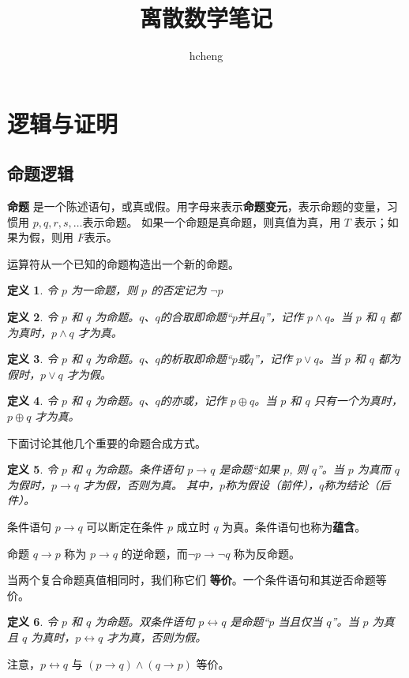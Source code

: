 \documentclass{ctexart}
\title{离散数学笔记}
\author{hcheng}
\newtheorem{definition}{\indent 定义}[section]
\begin{document}
\maketitle
\section{逻辑与证明}
\subsection{命题逻辑}
\textbf{命题} 是一个陈述语句，或真或假。用字母来表示\textbf{命题变元}，表示命题的变量，习惯用 $p, q, r, s, \ldots $表示命题。
如果一个命题是真命题，则真值为真，用 $T$ 表示；如果为假，则用 $F$表示。

运算符从一个已知的命题构造出一个新的命题。
\begin{definition}
    令 $p$ 为一命题，则 $p$ 的否定记为 $\lnot p$
\end{definition}
\begin{definition}
    令 $p$ 和 $q$ 为命题。$q$、$q$的合取即命题“$p$并且$q$”，记作 $p \land q$。当 $p$ 和 $q$ 都为真时，$p \land q$ 才为真。
\end{definition}
\begin{definition}
    令 $p$ 和 $q$ 为命题。$q$、$q$的析取即命题“$p$或$q$”，记作 $p \lor q$。当 $p$ 和 $q$ 都为假时，$p \lor q$ 才为假。
\end{definition}
\begin{definition}
    令 $p$ 和 $q$ 为命题。$q$、$q$的亦或，记作 $p \oplus  q$。当 $p$ 和 $q$ 只有一个为真时，$p \oplus q$ 才为真。
\end{definition}
下面讨论其他几个重要的命题合成方式。
\begin{definition}
    令 $p$ 和 $q$ 为命题。条件语句 $p \rightarrow q$ 是命题“如果 $p$, 则 $q$”。当 $p$ 为真而 $q$ 为假时，$p \rightarrow q$ 才为假，否则为真。
    其中，$p$称为假设（前件），$q$称为结论（后件）。
\end{definition}
条件语句 $p \rightarrow q$ 可以断定在条件 $p$ 成立时 $q$ 为真。条件语句也称为\textbf{蕴含}。

命题 $q \rightarrow p$ 称为 $p \rightarrow q$ 的逆命题，而$\lnot p \rightarrow \lnot q$ 称为反命题。

当两个复合命题真值相同时，我们称它们 \textbf{等价}。一个条件语句和其逆否命题等价。

\begin{definition}
    令 $p$ 和 $q$ 为命题。双条件语句 $p \leftrightarrow  q$ 是命题“$p$ 当且仅当 $q$”。当 $p$ 为真且 $q$ 为真时，$p \leftrightarrow q$ 才为真，否则为假。
\end{definition}
注意，$p \leftrightarrow q$ 与 $(p \rightarrow q) \land (q \rightarrow p)$ 等价。
\end{document}
